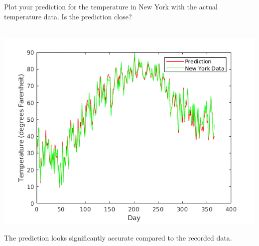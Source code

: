 Plot your prediction for the temperature in New York with the actual temperature data. Is the prediction close?

\begin{solution}\ \\
\includegraphics{e20p9.png}

The prediction looks significantly accurate compared to the recorded data.
\end{solution}